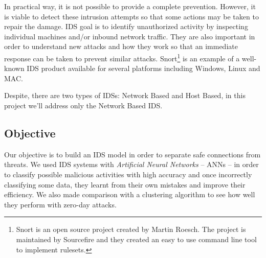 \documentclass[twocolumn,11pt]{asme2ej}
\begin{document}
In practical way, it is not possible to provide a complete prevention. However, it is viable to detect these intrusion attempts so that some actions may be taken to repair the damage.
IDS goal is to identify unauthorized activity by inspecting individual machines and/or inbound network traffic. They are also important in order to understand new attacks and how they work so that an immediate response can be taken to prevent similar attacks. Snort\footnote{Snort is an open source project created by Martin Roesch. The project is maintained by Sourcefire and they created an easy to use command line tool to implement rulesets.} is an example of a well-known IDS product available for several platforms including Windows, Linux and MAC.

Despite, there are two types of IDSs: Network Based and Host Based, in this project we'll address only the Network Based IDS.
%

\subsection{Objective}

Our objective is to build an IDS model in order to separate safe connections from threats. We used IDS systems with \textit{Artificial Neural Networks} -- ANNs -- in order to classify possible malicious activities with high accuracy and once incorrectly classifying some data, they learnt from their own mistakes and improve their efficiency. We also made comparison with a clustering algorithm to see how well they perform with zero-day attacks.
\end{document}

